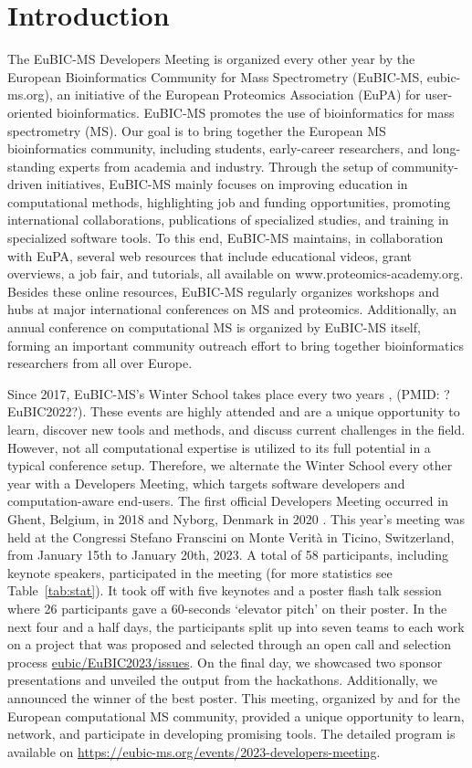 \section{Introduction}
The EuBIC-MS Developers Meeting is organized every other year by the European Bioinformatics Community for Mass Spectrometry (EuBIC-MS, eubic-ms.org), an initiative of the European Proteomics Association (EuPA) for user-oriented bioinformatics. EuBIC-MS promotes the use of bioinformatics for mass spectrometry (MS). Our goal is to bring together the European MS bioinformatics community, including students, early-career researchers, and long-standing experts from academia and industry. Through the setup of community-driven initiatives, EuBIC-MS mainly focuses on improving education in computational methods, highlighting job and funding opportunities, promoting international collaborations, publications of specialized studies, and training in specialized software tools. To this end, EuBIC-MS maintains, in collaboration with EuPA, several web resources that include educational videos, grant overviews, a job fair, and tutorials, all available on www.proteomics-academy.org. Besides these online resources, EuBIC-MS regularly organizes workshops and hubs at major international conferences on MS and proteomics. Additionally, an annual conference on computational MS is organized by EuBIC-MS itself, forming an important community outreach effort to bring together bioinformatics researchers from all over Europe.

Since 2017, EuBIC-MS's Winter School takes place every two years \citep{pmid28385664}, (PMID: ?EuBIC2022?). These events are highly attended and are a unique opportunity to learn, discover new tools and methods, and discuss current challenges in the field. However, not all computational expertise is utilized to its full potential in a typical conference setup. Therefore, we alternate the Winter School every other year with a Developers Meeting, which targets software developers and computation-aware end-users. The first official Developers Meeting occurred in Ghent, Belgium, in 2018 \citep{pmid29864591} and Nyborg, Denmark in 2020 \citep{EuBIC-MS2020}. This year's meeting was held at the Congressi Stefano Franscini on Monte Verità in Ticino, Switzerland, from January 15th to January 20th, 2023. A total of 58 participants, including keynote speakers, participated in the meeting (for more statistics see Table~\ref{tab:stat}). It took off with five keynotes and a poster flash talk session where 26 participants gave a 60-seconds `elevator pitch' on their poster. In the next four and a half days, the participants split up into seven teams to each work on a project that was proposed and selected through an open call and selection process \href{https://github.com/eubic/EuBIC2023/issues}{eubic/EuBIC2023/issues}. On the final day, we showcased two sponsor presentations and unveiled the output from the hackathons. Additionally, we announced the winner of the best poster. This meeting, organized by and for the European computational MS community, provided a unique opportunity to learn, network, and participate in developing promising tools. The detailed program is available on \url{https://eubic-ms.org/events/2023-developers-meeting}.

